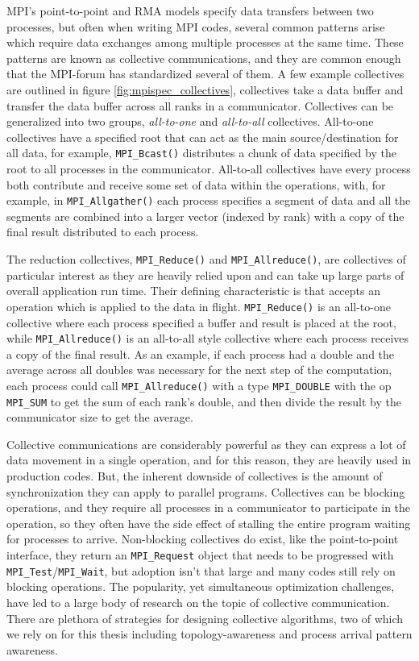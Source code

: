 MPI's point-to-point and RMA models specify data transfers between two processes, but often when writing MPI codes, several common patterns arise which require data exchanges among multiple processes at the same time.
These patterns are known as collective communications, and they are common enough that the MPI-forum has standardized several of them.
A few example collectives are outlined in figure \ref{fig:mpispec_collectives}, collectives take a data buffer and transfer the data buffer across all ranks in a communicator.
Collectives can be generalized into two groups, \textit{all-to-one} and \textit{all-to-all} collectives.
All-to-one collectives have a specified root that can act as the main source/destination for all data, for example, \texttt{MPI\_Bcast()} distributes a chunk of data specified by the root to all processes in the communicator.
All-to-all collectives have every process both contribute and receive some set of data within the operations, with, for example, in \texttt{MPI\_Allgather()} each process specifies a segment of data and all the segments are combined into a larger vector (indexed by rank) with a copy of the final result distributed to each process.

The reduction collectives, \texttt{MPI\_Reduce()} and \texttt{MPI\_Allreduce()}, are collectives of particular interest as they are heavily relied upon and can take up large parts of overall application run time.
Their defining characteristic is that accepts an operation which is applied to the data in flight.
\texttt{MPI\_Reduce()} is an all-to-one collective where each process specified a buffer and result is placed at the root, while \texttt{MPI\_Allreduce()} is an all-to-all style collective where each process receives a copy of the final result. 
As an example, if each process had a double and the average across all doubles was necessary for the next step of the computation, each process could call \texttt{MPI\_Allreduce()} with a type \texttt{MPI\_DOUBLE} with the op \texttt{MPI\_SUM} to get the sum of each rank's double, and then divide the result by the communicator size to get the average.

Collective communications are considerably powerful as they can express a lot of data movement in a single operation, and for this reason, they are heavily used in production codes.
But, the inherent downside of collectives is the amount of synchronization they can apply to parallel programs. 
Collectives can be blocking operations, and they require all processes in a communicator to participate in the operation, so they often have the side effect of stalling the entire program waiting for processes to arrive.
Non-blocking collectives do exist, like the point-to-point interface, they return an \texttt{MPI\_Request} object that needs to be progressed with \texttt{MPI\_Test}/\texttt{MPI\_Wait}, but adoption isn't that large and many codes still rely on blocking operations.
The popularity, yet simultaneous optimization challenges, have led to a large body of research on the topic of collective communication. 
There are plethora of strategies for designing collective algorithms, two of which we rely on for this thesis including topology-awareness and process arrival pattern awareness.

